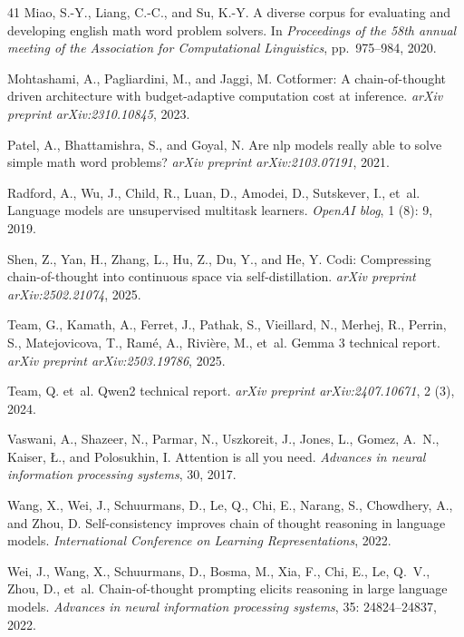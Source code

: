 \begin{thebibliography}{41}
Miao, S.-Y., Liang, C.-C., and Su, K.-Y.
\newblock A diverse corpus for evaluating and developing english math word
  problem solvers.
\newblock In \textit{Proceedings of the 58th annual meeting of the Association
  for Computational Linguistics}, pp.\  975--984, 2020.

Mohtashami, A., Pagliardini, M., and Jaggi, M.
\newblock Cotformer: A chain-of-thought driven architecture with
  budget-adaptive computation cost at inference.
\newblock \textit{arXiv preprint arXiv:2310.10845}, 2023.

Patel, A., Bhattamishra, S., and Goyal, N.
\newblock Are nlp models really able to solve simple math word problems?
\newblock \textit{arXiv preprint arXiv:2103.07191}, 2021.

Radford, A., Wu, J., Child, R., Luan, D., Amodei, D., Sutskever, I., et~al.
\newblock Language models are unsupervised multitask learners.
\newblock \textit{OpenAI blog}, 1 (8): 9, 2019.

Shen, Z., Yan, H., Zhang, L., Hu, Z., Du, Y., and He, Y.
\newblock Codi: Compressing chain-of-thought into continuous space via
  self-distillation.
\newblock \textit{arXiv preprint arXiv:2502.21074}, 2025.

Team, G., Kamath, A., Ferret, J., Pathak, S., Vieillard, N., Merhej, R.,
  Perrin, S., Matejovicova, T., Ram{\'e}, A., Rivi{\`e}re, M., et~al.
\newblock Gemma 3 technical report.
\newblock \textit{arXiv preprint arXiv:2503.19786}, 2025.

Team, Q. et~al.
\newblock Qwen2 technical report.
\newblock \textit{arXiv preprint arXiv:2407.10671}, 2 (3), 2024.

Vaswani, A., Shazeer, N., Parmar, N., Uszkoreit, J., Jones, L., Gomez, A.~N.,
  Kaiser, {\L}., and Polosukhin, I.
\newblock Attention is all you need.
\newblock \textit{Advances in neural information processing systems}, 30, 2017.

Wang, X., Wei, J., Schuurmans, D., Le, Q., Chi, E., Narang, S., Chowdhery, A.,
  and Zhou, D.
\newblock Self-consistency improves chain of thought reasoning in language
  models.
\newblock \textit{International Conference on Learning Representations}, 2022.

Wei, J., Wang, X., Schuurmans, D., Bosma, M., Xia, F., Chi, E., Le, Q.~V.,
  Zhou, D., et~al.
\newblock Chain-of-thought prompting elicits reasoning in large language
  models.
\newblock \textit{Advances in neural information processing systems},
  35: 24824--24837, 2022.


\end{thebibliography}
